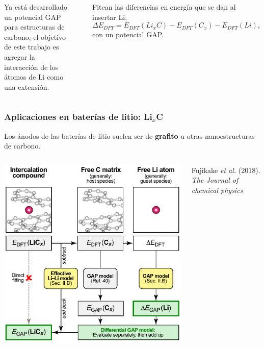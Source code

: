 \documentclass[aspectratio=169]{beamer}
\let\oldtextbf\textbf
\renewcommand{\textbf}[1]{\textcolor{nordblue}{\oldtextbf{#1}}}
\begin{document}
\begin{frame}
\begin{columns}
            \pause

            Ya está desarrollado un potencial GAP para estructuras de carbono, 
            el objetivo de este trabajo es agregar la interacción de los átomos
            de Li como una extensión.
            
            \ \pause

            Fitean las diferencias en energía que se dan al insertar Li,
            $$
            \Delta E_{DFT} = E_{DFT}(Li_xC) - E_{DFT}(C_x) - E_{DFT}(Li),
            $$
            con un potencial GAP.

        \end{columns}

    \end{frame}
    
    \begin{frame}
        \frametitle{Aplicaciones en baterías de litio: Li$_x$C}
            
        Los ánodos de las baterías de litio suelen ser de \textbf{grafito} u otras
        nanoestructuras de carbono.
        
        \begin{columns}
            \begin{center}
                \includegraphics[width=0.9\columnwidth]{LiC-metodo.png}
            \end{center}
            \tiny{Fujikake \textit{et al.} (2018). \textit{The Journal of chemical
            physics}}


\end{columns}
\end{frame}
\end{document}
